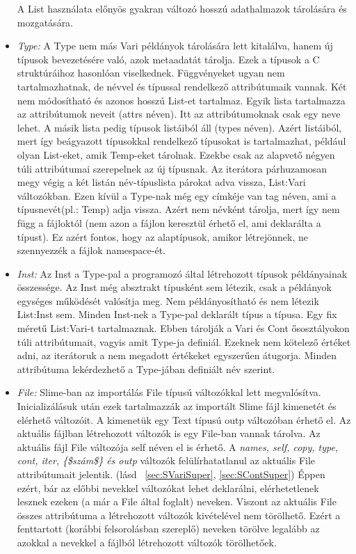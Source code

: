 \begin{itemize}
A List használata előnyös gyakran változó hosszú adathalmazok tárolására és mozgatására.
\item \emph{Type:} 
A Type nem más Vari példányok tárolására lett kitalálva, hanem új típusok bevezetésére való, azok metaadatát tárolja.
Ezek a típusok a C struktúráihoz hasonlóan viselkednek.
Függvényeket ugyan nem tartalmazhatnak, de névvel és típussal rendelkező attribútumaik vannak.
Két nem módosítható és azonos hosszú List-et tartalmaz.
Egyik lista tartalmazza az attribútumok neveit (attrs néven).
Itt az attribútumoknak csak egy neve lehet.
A másik lista pedig típusok listáiból áll (types néven).
Azért listáiból, mert így beágyazott típusokkal rendelkező típusokat is tartalmazhat, például olyan List-eket, amik Temp-eket tárolnak.
Ezekbe csak az alapvető négyen túli attribútumai szerepelnek az új típusnak.
Az iterátora párhuzamosan megy végig a két listán név-típuslista párokat adva vissza, List:Vari változókban.
Ezen kívül a Type-nak még egy címkéje van tag néven, ami a típusnevét(pl.: Temp) adja vissza.
Azért nem névként tárolja, mert így nem függ a fájloktól (nem azon a fájlon keresztül érhető el, ami deklarálta a típust).
Ez azért fontos, hogy az alaptípusok, amikor létrejönnek, ne szennyezzék a fájlok namespace-ét.
\item \emph{Inst:} 
Az Inst a Type-pal a programozó által létrehozott típusok példányainak összessége.
Az Inst még absztrakt típusként sem létezik, csak a példányok egységes működését valósítja meg.
Nem példányosítható és nem létezik List:Inst sem.
Minden Inst-nek a Type-pal deklarált típus a típusa.
Egy fix méretű List:Vari-t tartalmaznak.
Ebben tárolják a Vari és Cont ősosztályokon túli attribútumait, vagyis amit Type-ja definiál.
Ezeknek nem kötelező értéket adni, az iterátoruk a nem megadott értékeket egyszerűen átugorja.
Minden attribútuma lekérdezhető a Type-jában definiált név szerint.
\item \emph{File:} 
Slime-ban az importálás File típusú változókkal lett megvalósítva.
Inicializálásuk után ezek tartalmazzák az importált Slime fájl kimenetét és elérhető változóit.
A kimenetük egy Text típusú outp változóban érhető el.
Az aktuális fájlban létrehozott változók is egy File-ban vannak tárolva.
Az aktuális fájl File változója self néven el is érhető.
A \textit{names, self, copy, type, cont, iter, \{\$szám\$\} és outp} változók felülírhatatlanul az aktuális File attribútumait jelentik.
(lásd ~\ref{sec:SVariSuper}, \ref{sec:SContSuper})
Éppen ezért, bár az előbbi nevekkel változókat lehet deklarálni, elérhetetlenek lesznek ezeken (a már a File által foglalt) neveken. 
Viszont az aktuális File összes attribútuma a létrehozott változók kivételével nem törölhető.
Ezért a fenttartott (korábbi felsorolásban szereplő) neveken törölve legalább az azokkal a nevekkel a fájlból létrehozott változók törölhetőek.
\end{itemize}


